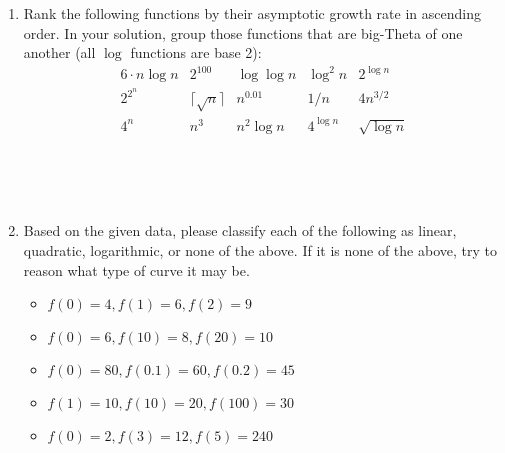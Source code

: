 \documentclass[11pt]{article}
\begin{document}
\begin{enumerate}[leftmargin=*]
\item Rank the following functions by their asymptotic growth rate in ascending order.  In your solution, group those functions that are big-Theta of one another (all $\log$ functions are base 2):
    \begin{equation*}
        \begin{array}{ccccc}
            6 \cdot n\log n & 2^{100} & \log \log n & \log^2 n & 2^{\log n} \\
            2^{2^n} & \lceil\sqrt{n}\rceil & n^{0.01} & 1/n & 4n^{3/2} \\
            4^n & n^3 & n^2\log n & 4^{\log n} & \sqrt{\log n} \\
        \end{array}
    \end{equation*}
\begin{verbatim}
    
    
    
\end{verbatim}
\item Based on the given data, please classify each of the following as linear, quadratic, logarithmic, or none of the above. If it is none of the above, try to reason what type of curve it may be.
\begin{itemize}
    \item $f(0) = 4, f(1) = 6, f(2) = 9$
    \item $f(0) = 6, f(10) = 8, f(20) = 10$
    \item $f(0) = 80, f(0.1) = 60, f(0.2) = 45$
    \item $f(1) = 10, f(10) = 20, f(100) = 30$
    \item $f(0) = 2, f(3) = 12, f(5) = 240$
\end{itemize}

\end{enumerate}

\label{r:lastpage}
\end{document}
